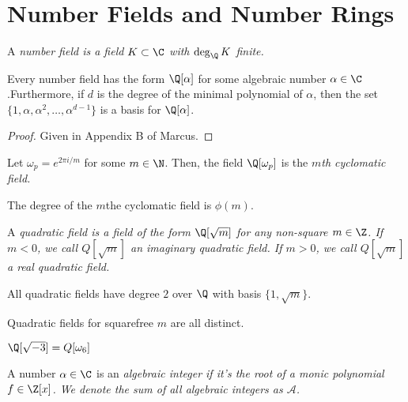\section{Number Fields and Number Rings}

\begin{definition}
	A \em{number field} is a field $K \subset \C$ with $\deg_\Q K$ finite.
\end{definition}

\begin{theorem}
	Every number field has the form $\Q[\alpha]$ for some algebraic number $\alpha \in \C$.Furthermore, if $d$ is the degree of the minimal polynomial of $\alpha$, then the set $\{1, \alpha, \alpha^2, \ldots, \alpha^{d-1} \}$ is a basis for $\Q[\alpha]$.
\end{theorem}

\begin{proof}
	Given in Appendix B of Marcus.
\end{proof}

\begin{definition}
	Let $\omega_p = e^{2 \pi i / m}$ for some $m \in \N$. Then, the field $\Q[\omega_p]$ is the \em{$m$th cyclomatic field}.
\end{definition}

\begin{theorem}
	The degree of the $m$the cyclomatic field is $\phi(m)$.
\end{theorem}

\begin{definition}
	A \em{quadratic field} is a field of the form $\Q[\sqrt{m}]$ for any non-square $m \in \Z$. If $m < 0$, we call $Q[\sqrt{m}]$ an imaginary quadratic field. If $m > 0$, we call $Q[\sqrt{m}]$ a real quadratic field.
\end{definition}

\begin{theorem}
	All quadratic fields have degree $2$ over $\Q$ with basis $\{ 1, \sqrt{m} \}$.
\end{theorem}

\begin{theorem}
	Quadratic fields for squarefree $m$ are all distinct.
\end{theorem}

\begin{example}
	$\Q[\sqrt{-3}] = Q[\omega_6]$
\end{example}

\begin{definition}
	A number $\alpha \in \C$ is an \em{algebraic integer} if it's the root of a monic polynomial $f \in \Z[x]$.
	We denote the sum of all algebraic integers as $\mathcal A$.
\end{definition}

